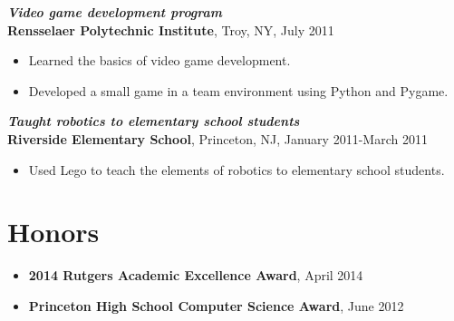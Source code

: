 \documentclass[12pt]{article}
\begin{document}
\textit{\textbf{Video game development program}} \\
\textbf{Rensselaer Polytechnic Institute}, Troy, NY, July 2011
\begin{itemize}
\item
Learned the basics of video game development.
\item
Developed a small game in a team environment using Python and Pygame.
\end{itemize}

\textit{\textbf{Taught robotics to elementary school students}} \\
\textbf{Riverside Elementary School}, Princeton, NJ, January 2011-March 2011
\begin{itemize}
\item
Used Lego to teach the elements of robotics to elementary school students.
\end{itemize}

\fi

\section*{Honors}
\begin{itemize}
\item
\textbf{2014 Rutgers Academic Excellence Award}, April 2014
\item
\textbf{Princeton High School Computer Science Award}, June 2012
\end{itemize}
\end{document}
